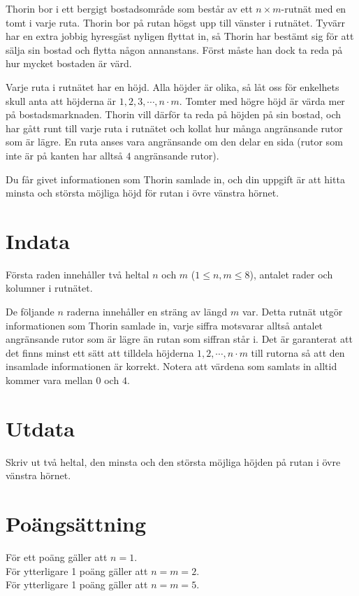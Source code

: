 

\noindent
Thorin bor i ett bergigt bostadsområde som består av ett $n \times m$-rutnät med en tomt i varje ruta.
Thorin bor på rutan högst upp till vänster i rutnätet.
Tyvärr har en extra jobbig hyresgäst nyligen flyttat in, så Thorin har bestämt sig för att sälja sin bostad och flytta någon annanstans.
Först måste han dock ta reda på hur mycket bostaden är värd.

Varje ruta i rutnätet har en höjd. Alla höjder är olika, så låt oss för enkelhets skull anta att höjderna är $1, 2, 3, \cdots, n\cdot m$.
Tomter med högre höjd är värda mer på bostadsmarknaden.
Thorin vill därför ta reda på höjden på sin bostad, och har gått runt till varje ruta i rutnätet och kollat hur många angränsande rutor som är lägre.
En ruta anses vara angränsande om den delar en sida (rutor som inte är på kanten har alltså $4$ angränsande rutor).

Du får givet informationen som Thorin samlade in, och din uppgift är att hitta minsta och största möjliga höjd för rutan i övre vänstra hörnet.

\section*{Indata}
Första raden innehåller två heltal $n$ och $m$ ($1 \leq n,m \leq 8$), antalet rader och kolumner i
rutnätet.

De följande $n$ raderna innehåller en sträng av längd $m$ var. Detta rutnät utgör informationen
som Thorin samlade in, varje siffra motsvarar alltså antalet angränsande rutor som är lägre än rutan som
siffran står i. Det är garanterat att det finns minst ett sätt att tilldela höjderna 
$1, 2, \cdots, n\cdot m$ till rutorna så att den insamlade informationen är korrekt. Notera att värdena
som samlats in alltid kommer vara mellan $0$ och $4$.

\section*{Utdata}
Skriv ut två heltal, den minsta och den största möjliga höjden på rutan i övre vänstra hörnet.

\section*{Poängsättning}
För ett poäng gäller att $n = 1$.\\
För ytterligare 1 poäng gäller att $n = m = 2$.\\
För ytterligare 1 poäng gäller att $n = m = 5$.\\
